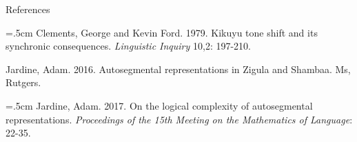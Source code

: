 \documentclass{article}
\begin{document}
\pagebreak
\begin{center} References \end{center}
\smallskip{}
\hangindent=.5cm
Clements, George and Kevin Ford. 1979. Kikuyu tone shift and its synchronic consequences. \textit{Linguistic Inquiry} 10,2: 197-210.\\
\par \noindent
Jardine, Adam. 2016. Autosegmental representations in Zigula and Shambaa. Ms, Rutgers.\\
\par \noindent
\hangindent=.5cm
Jardine, Adam. 2017. On the logical complexity of autosegmental representations. \textit{Proceedings of the 15th Meeting on the Mathematics of Language}: 22-35.\\
\end{document}
